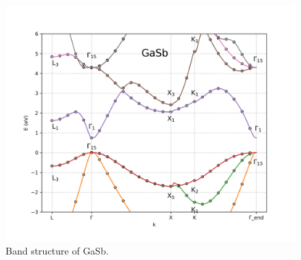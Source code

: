 \documentclass[twocolumn]{article}[h]
\begin{document}
\begin{figure}[htb]
    \centering
    \includegraphics[width=\linewidth]{GaSb.png}
    \vspace{-1cm}
    \caption{Band structure of GaSb.}
    \label{fig:GaSb}
\end{figure}
\end{document}
